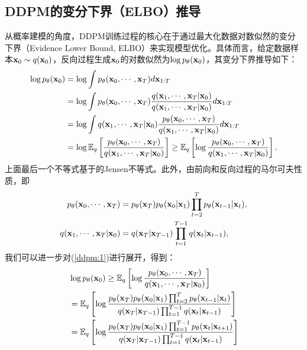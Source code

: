 \documentclass[11pt,a4paper,UTF8]{ctexart}
\begin{document}
\newpage


\newpage



\begin{appendices}

\section{DDPM的变分下界（ELBO）推导}
\label{app:ddpm_elbo}

从概率建模的角度，DDPM训练过程的核心在于通过最大化数据对数似然的变分下界（Evidence Lower Bound, ELBO）来实现模型优化。具体而言，给定数据样本$\mathbf{x}_0\sim q(\mathbf{x}_0)$，反向过程生成$\mathbf{x}_0$的对数似然为$\log p_{\theta}(\mathbf{x}_0)$，其变分下界推导如下：
\begin{align}
\begin{split}
    \log p_{\theta}(\mathbf{x}_0) &= \log \int p_{\theta}(\mathbf{x}_0,\cdots,\mathbf{x}_T)d\mathbf{x}_{1:T} \\
    &= \log \int p_{\theta}(\mathbf{x}_0,\cdots,\mathbf{x}_T)\frac{q(\mathbf{x}_1,\cdots,\mathbf{x}_T|\mathbf{x}_0)}{q(\mathbf{x}_1,\cdots,\mathbf{x}_T|\mathbf{x}_0)}d\mathbf{x}_{1:T} \\
    &= \log \int q(\mathbf{x}_1,\cdots,\mathbf{x}_T|\mathbf{x}_0)\frac{p_{\theta}(\mathbf{x}_0,\cdots,\mathbf{x}_T)}{q(\mathbf{x}_1,\cdots,\mathbf{x}_T|\mathbf{x}_0)}d\mathbf{x}_{1:T} \\
    &= \log \mathbb{E}_q \left[\frac{p_{\theta}(\mathbf{x}_0,\cdots,\mathbf{x}_T)}{q(\mathbf{x}_1,\cdots,\mathbf{x}_T|\mathbf{x}_0)}\right]  \geq \mathbb{E}_q \left[\log \frac{p_{\theta}(\mathbf{x}_0,\cdots,\mathbf{x}_T)}{q(\mathbf{x}_1,\cdots,\mathbf{x}_T|\mathbf{x}_0)}\right].
\end{split}
\label{ddpm:1}
\end{align}
上面最后一个不等式基于的Jensen不等式。此外，由前向和反向过程的马尔可夫性质，即
\begin{align*}
    p_{\theta}(\mathbf{x}_0,\cdots,\mathbf{x}_T) &= p_{\theta}(\mathbf{x}_T)p_{\theta}(\mathbf{x}_0|\mathbf{x}_1)\prod_{t=2}^T p_{\theta}(\mathbf{x}_{t-1}|\mathbf{x}_t),\\
    q(\mathbf{x}_1,\cdots,\mathbf{x}_T|\mathbf{x}_0) &= q(\mathbf{x}_T|\mathbf{x}_{T-1})\prod_{t=1}^{T-1}q(\mathbf{x}_t|\mathbf{x}_{t-1}),
\end{align*}
我们可以进一步对(\ref{ddpm:1})进行展开，得到：
\begin{align}
\begin{split}
    &\log p_{\theta}(\x_0) \geq \E_q \left[\log \frac{p_{\theta}(\x_0,\cdots,\x_T)}{q(\x_1,\cdots,\x_T|\x_0)}\right] \\
    &= \E_q \left[\log\frac{p_{\theta}(\x_T)p_{\theta}(\x_0|\x_1)\prod_{t=2}^T p_{\theta}(\x_{t-1}|\x_t)}{q(\x_T|\x_{T-1})\prod_{t=1}^{T-1}q(\x_t|\x_{t-1})} \right] \\
    &= \E_q \left[\log\frac{p_{\theta}(\x_T)p_{\theta}(\x_0|\x_1)\prod_{t=1}^{T-1} p_{\theta}(\x_{t}|\x_{t+1})}{q(\x_T|\x_{T-1})\prod_{t=1}^{T-1}q(\x_t|\x_{t-1})} \right] \\

\end{split}
\end{align}
\end{appendices}
\end{document}
